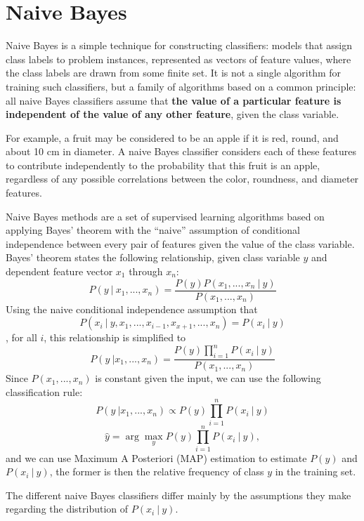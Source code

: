 ﻿\documentclass[a4paper, 11pt]{article}
\begin{document}
\section{Naive Bayes}

Naive Bayes is a simple technique for constructing classifiers: models that assign class labels to problem instances, represented as vectors of feature values, where the class labels are drawn from some finite set. It is not a single algorithm for training such classifiers, but a family of algorithms based on a common principle: all naive Bayes classifiers assume that \textbf{the value of a particular feature is independent of the value of any other feature}, given the class variable.

For example, a fruit may be considered to be an apple if it is red, round, and about 10 cm in diameter. A naive Bayes classifier considers each of these features to contribute independently to the probability that this fruit is an apple, regardless of any possible correlations between the color, roundness, and diameter features.

Naive Bayes methods are a set of supervised learning algorithms based on applying Bayes’ theorem with the ``naive'' assumption of conditional independence between every pair of features given the value of the class variable. Bayes’ theorem states the following relationship, given class variable $y$ and dependent feature vector $x_1$ through $x_n$:
$$P(y\ |\ x_1,...,x_n)=\frac{P(y)P(x_1,...,x_n\ |\ y)}{P(x_1,...,x_n)}$$
Using the naive conditional independence assumption that
$$P(x_i\ |\ y,x_1,...,x_{i-1},x_{x+1},...,x_n)=P(x_i\ |\ y)$$,
for all $i$, this relationship is simplified to
$$P(y\ | x_1,...,x_n)=\frac{P(y)\prod_{i=1}^n P(x_i\ |\ y)}{P(x_1,...,x_n)}$$
Since $P(x_1,...,x_n)$ is constant given the input, we can use the following classification rule:
$$P(y\ | x_1,...,x_n)\propto P(y)\prod_{i=1}^n P(x_i\ |\ y)$$
$$\hat{y}=\arg\max\limits_y P(y)\prod^n_{i=1}P(x_i\ |\ y),$$
and we can use Maximum A Posteriori (MAP) estimation to estimate $P(y)$ and $P(x_i\ |\ y)$, the former is then the relative frequency of class $y$ in the training set.

The different naive Bayes classifiers differ mainly by the assumptions they make regarding the distribution of $P(x_i\ |\ y)$.
\end{document}
